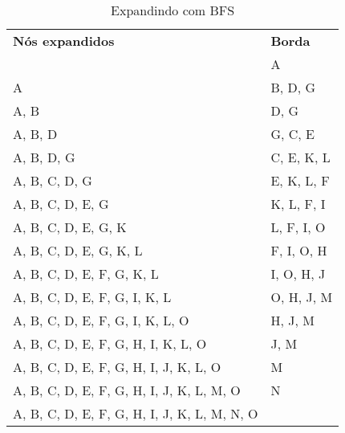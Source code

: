 \documentclass[12pt,letterpaper]{article}
\begin{document}
	\newpage
	
	\begin{table}[]
		\centering
		\caption{Expandindo com BFS}
		\label{my-label}
		\begin{tabular}{l|l}
			\textbf{Nós expandidos}                      & \textbf{Borda} \\ \cline{1-2}
			                                             & A              \\ \cline{1-2}
			A                                            & B, D, G        \\ \cline{1-2}
			A, B                                         & D, G           \\ \cline{1-2}
			A, B, D                                      & G, C, E        \\ \cline{1-2}
			A, B, D, G                                   & C, E, K, L     \\ \cline{1-2}
			A, B, C, D, G                                & E, K, L, F     \\ \cline{1-2}
			A, B, C, D, E, G                             & K, L, F, I     \\ \cline{1-2}
			A, B, C, D, E, G, K                          & L, F, I, O     \\ \cline{1-2}
			A, B, C, D, E, G, K, L                       & F, I, O, H     \\ \cline{1-2}
			A, B, C, D, E, F, G, K, L                    & I, O, H, J     \\ \cline{1-2}
			A, B, C, D, E, F, G, I, K, L                 & O, H, J, M     \\ \cline{1-2}
			A, B, C, D, E, F, G, I, K, L, O              & H, J, M        \\ \cline{1-2}
			A, B, C, D, E, F, G, H, I, K, L, O           & J, M           \\ \cline{1-2}
			A, B, C, D, E, F, G, H, I, J, K, L, O        & M              \\ \cline{1-2}
			A, B, C, D, E, F, G, H, I, J, K, L, M, O     & N              \\ \cline{1-2}
			A, B, C, D, E, F, G, H, I, J, K, L, M, N, O  &                \\
		\end{tabular}
	\end{table}
\end{document}
